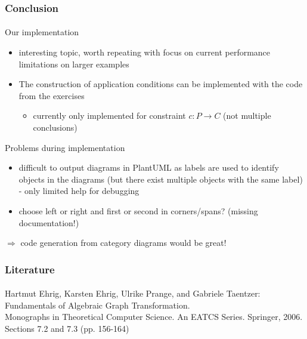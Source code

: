 \documentclass[32pt,t]{beamer}
\begin{document}
	\begin{frame}
		\frametitle{Conclusion}
		\framesubtitle{}
		\begin{block}{Our implementation}
			\begin{itemize}
				\item interesting topic, worth repeating with focus on current performance limitations on larger examples
				\item The construction of application conditions can be implemented with the code from the exercises
				\begin{itemize}
					\item currently only implemented for constraint $c: P \rightarrow C$ (not multiple conclusions)
				\end{itemize}
			\end{itemize}
		\end{block}
	
		\begin{block}{Problems during implementation}
			\begin{itemize}
				\item difficult to output diagrams in PlantUML as labels are used to identify objects in the diagrams (but there exist multiple objects with the same label) - only limited help for debugging
				\item choose left or right and first or second in corners/spans? (missing documentation!)
			\end{itemize}
			$\Rightarrow$ code generation from category diagrams would be great!
		\end{block}
	\end{frame}
	
	\begin{frame}
		\frametitle{Literature}
		\framesubtitle{}
		Hartmut Ehrig, Karsten Ehrig, Ulrike Prange, and Gabriele
		Taentzer: \\
		Fundamentals of Algebraic Graph Transformation. \\
		Monographs in Theoretical Computer Science. An EATCS
		Series. Springer, 2006. \\
		Sections 7.2 and 7.3 (pp. 156-164)
	\end{frame}
\end{document}
